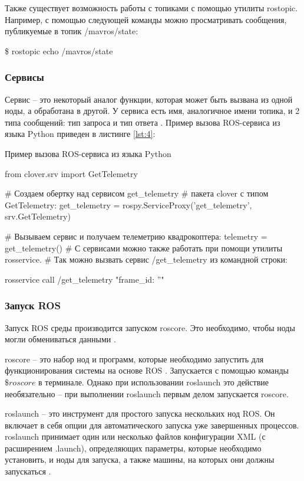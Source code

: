 Также существует возможность работы с топиками с помощью утилиты rostopic. Например, с помощью следующей команды можно просматривать сообщения, публикуемые в топик /mavros/state:

\$ rostopic echo /mavros/state
\subsubsection{Сервисы}

Сервис -- это некоторый аналог функции, которая может быть вызвана из одной ноды, а обработана в другой. У сервиса есть имя, аналогичное имени топика, и 2 типа сообщений: тип запроса и тип ответа \cite{clover}. Пример вызова ROS-сервиса из языка Python приведен в листинге \ref{lst:4}:

\begin{Program}[H]
	\caption{Пример вызова ROS-сервиса из языка Python} \label{lst:4}
\begin{MyCode}
from clover.srv import GetTelemetry

# Создаем обертку над сервисом get_telemetry
# пакета clover с типом GetTelemetry:
get_telemetry = rospy.ServiceProxy('get_telemetry',
srv.GetTelemetry)

# Вызываем сервис и получаем телеметрию квадрокоптера:
telemetry = get_telemetry()
# С сервисами можно также работать при помощи утилиты rosservice.
# Так можно вызвать сервис /get_telemetry из командной строки:

rosservice call /get_telemetry "{frame_id: ''}"
\end{MyCode}
\end{Program}

\subsubsection{Запуск ROS}
Запуск ROS среды производится запуском roscore. Это необходимо, чтобы ноды могли обмениваться данными \cite{pkg}.

roscore -- это набор нод и программ, которые необходимо запустить для функционирования системы на основе ROS \cite{ros}. Запускается с помощью команды \(\$ roscore\) в терминале. Однако при использовании roslaunch это действие необязательно -- при выполнении roslaunch первым делом запускается roscore.

roslaunch -- это инструмент для простого запуска нескольких нод ROS. Он включает в себя опции для автоматического запуска уже завершенных процессов. roslaunch принимает один или несколько файлов конфигурации XML (с расширением .launch), определяющих параметры, которые необходимо установить, и ноды для запуска, а также машины, на которых они должны запускаться \cite{ros}.


